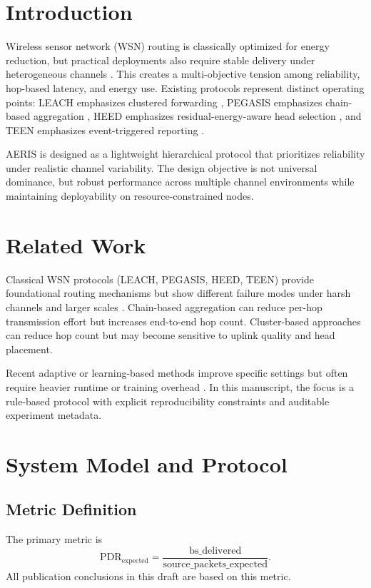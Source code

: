 \documentclass[sensors,article,submit,moreauthors,pdftex]{Definitions/mdpi}
\begin{document}
\section{Introduction}
Wireless sensor network (WSN) routing is classically optimized for energy reduction, but practical deployments also require stable delivery under heterogeneous channels \cite{Akyildiz2002Survey,Rault2016Energy}. This creates a multi-objective tension among reliability, hop-based latency, and energy use. Existing protocols represent distinct operating points: LEACH emphasizes clustered forwarding \cite{Heinzelman2000LEACH}, PEGASIS emphasizes chain-based aggregation \cite{Lindsey2002PEGASIS}, HEED emphasizes residual-energy-aware head selection \cite{Younis2004HEED}, and TEEN emphasizes event-triggered reporting \cite{Manjeshwar2001TEEN}.

AERIS is designed as a lightweight hierarchical protocol that prioritizes reliability under realistic channel variability. The design objective is not universal dominance, but robust performance across multiple channel environments while maintaining deployability on resource-constrained nodes.

\section{Related Work}
Classical WSN protocols (LEACH, PEGASIS, HEED, TEEN) provide foundational routing mechanisms but show different failure modes under harsh channels and larger scales \cite{Heinzelman2002LEACH,Lindsey2002PEGASIS,Younis2004HEED}. Chain-based aggregation can reduce per-hop transmission effort but increases end-to-end hop count. Cluster-based approaches can reduce hop count but may become sensitive to uplink quality and head placement.

Recent adaptive or learning-based methods improve specific settings but often require heavier runtime or training overhead \cite{Ren2024,Okine2024}. In this manuscript, the focus is a rule-based protocol with explicit reproducibility constraints and auditable experiment metadata.

\section{System Model and Protocol}
\subsection{Metric Definition}
The primary metric is
\begin{equation}
\mathrm{PDR}_{\mathrm{expected}} = \frac{\mathrm{bs\_delivered}}{\mathrm{source\_packets\_expected}}.
\end{equation}
All publication conclusions in this draft are based on this metric.
\end{document}
